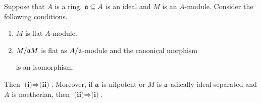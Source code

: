 \begin{theorem}\label{theorem:gradedflatness}
Suppose that $A$ is a ring, $\mathfrak{a}\subseteq A$ is an ideal and $M$ is an $A$-module. Consider the following conditions.
\begin{enumerate}[label=\emph{\textbf{(\roman*)}}, leftmargin=*]
\item $M$ is flat $A$-module.
\item $M/\mathfrak{a}M$ is flat as $A/\mathfrak{a}$-module and the canonical morphism
\begin{center}
\end{center} 
is an isomorphism.
\end{enumerate}
Then \emph{$\textbf{(i)}\Rightarrow \textbf{(ii)}$}. Moreover, if $\mathfrak{a}$ is nilpotent or $M$ is $\mathfrak{a}$-adically ideal-separated and $A$ is noetherian, then \emph{$\textbf{(ii)}\Rightarrow \textbf{(i)}$}.
\end{theorem}
